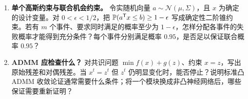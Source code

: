 \begin{enumerate}[label=\textbf{\arabic*.},ref=\arabic*,itemsep=10pt]
\item \label{ex:chance}\textbf{单个高斯约束与联合机会约束。}
令实随机向量 $a\sim\mathcal N(\mu,\Sigma)$，且 $x$ 为确定的设计变量。对 $0<\epsilon<1/2$，把
$\mathbb P(a^{\mathsf T}x\leq b)\geq1-\epsilon$ 写成确定性二阶锥约束。若有 $m$ 个事件、要求同时满足的概率至少为 $1-\epsilon$，怎样分配各事件的失败概率才能得到充分条件？每个事件分别满足概率 $0.95$，是否足以保证联合概率 $0.95$？

\item \label{ex:admm}\textbf{ADMM 应检查什么？}
对共识问题 $\min f(x)+g(z)$、约束 $x=z$，写出原始残差和对偶残差。当 $x^t=z^t$ 但 $z^t$ 仍明显变化时，能否停止？说明标准凸 ADMM 收敛论证通常需要什么条件；将一个模块换成非凸神经网络后，哪些保证需要重新证明？
\end{enumerate}
